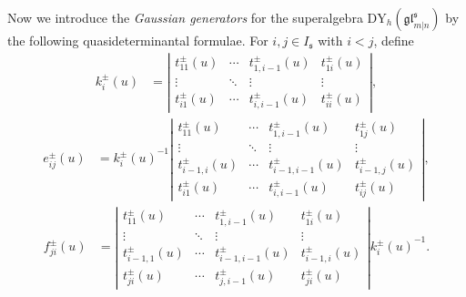 \documentclass[a4paper,12pt]{article}
\numberwithin{equation}{section}
\begin{document}
Now we introduce the \textit{Gaussian generators} for the superalgebra $\mathrm{DY}_{h}(\mathfrak{gl}^{\mathfrak{s}}_{m|n})$ by the following quasideterminantal formulae. For $i,j\in I_{\mathfrak{s}}$ with $i<j$, define
\begin{align*}
k_i^{\pm}(u)&=\left|\begin{array}{cccc}
t_{11}^{\pm}(u) & \cdots & t_{1, i-1}^{\pm}(u) & t_{1 i}^{\pm}(u) \\
\vdots & \ddots & \vdots& \vdots \\
t_{i 1}^{\pm}(u) & \cdots & t_{i, i-1}^{\pm}(u) & \boxed{t_{i i}^{\pm}(u)}
\end{array}\right|,
\end{align*}
\begin{align*}
e_{i j}^{\pm}(u)&={k_i^{\pm}(u)}^{-1}\left|\begin{array}{cccc}
t_{11}^{\pm}(u) & \cdots & t_{1, i-1}^{\pm}(u) & t_{1 j}^{\pm}(u) \\
\vdots & \ddots & \vdots & \vdots \\
t_{i-1, i}^{\pm}(u) & \cdots & t_{i-1, i-1}^{\pm}(u) & t_{i-1, j}^{\pm}(u) \\
t_{i 1}^{\pm}(u) & \cdots & t_{i, i-1}^{\pm}(u) & \boxed{t_{i j}^{\pm}(u)}
\end{array}\right|,
\end{align*}
\begin{align*}
f_{j i}^{\pm}(u)&=\left|\begin{array}{cccc}
t_{11}^{\pm}(u) & \cdots & t_{1, i-1}^{\pm}(u) & t_{1 i}^{\pm}(u) \\
\vdots & \ddots & \vdots & \vdots \\
t_{i-1,1}^{\pm}(u) & \cdots & t_{i-1, i-1}^{\pm}(u) & t_{i-1, i}^{\pm}(u) \\
t_{j i}^{\pm}(u) & \cdots & t_{j, i-1}^{\pm}(u) & \boxed{t_{j i}^{\pm}(u)}
\end{array}\right|{k_i^{\pm}(u)}^{-1}.
\end{align*}
\end{document}
